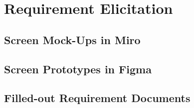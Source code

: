 \section{Requirement Elicitation}\label{sec:requirement-elicitation}
\subsection{Screen Mock-Ups in Miro}\label{subsec:screen-mock-ups-in-miro}
\subsection{Screen Prototypes in Figma}\label{subsec:screen-prototypes-in-figma}
\subsection{Filled-out Requirement Documents}\label{subsec:filled-out-requirement-documents}